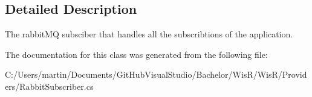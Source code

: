 \subsection{Detailed Description}
The rabbit\+M\+Q subsciber that handles all the subscribtions of the application. 



The documentation for this class was generated from the following file\+:\begin{DoxyCompactItemize}
\item 
C\+:/\+Users/martin/\+Documents/\+Git\+Hub\+Visual\+Studio/\+Bachelor/\+Wis\+R/\+Wis\+R/\+Providers/Rabbit\+Subscriber.\+cs\end{DoxyCompactItemize}
